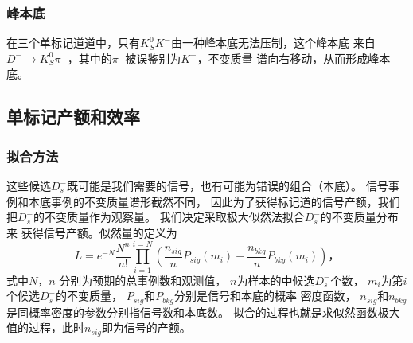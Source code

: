 \subsubsection{峰本底}
在三个单标记道道中，只有$K_{S}^{0}K^{-}$由一种峰本底无法压制，这个峰本底
来自$D^{-}\to K_{S}^{0} \pi^{-}$，其中的$\pi^{-}$被误鉴别为$K^{-}$，不变质量
谱向右移动，从而形成峰本底。

\subsection{单标记产额和效率}

\subsubsection{拟合方法}
这些候选$D_{s}^{-}$既可能是我们需要的信号，也有可能为错误的组合（本底）。
信号事例和本底事例的不变质量谱形截然不同，
因此为了获得标记道的信号产额，我们把$D_{s}^{-}$的不变质量作为观察量。
我们决定采取极大似然法拟合$D_{s}^{-}$的不变质量分布来
获得信号产额。似然量的定义为
\begin{equation}
    L = e^{-N} \frac{N^{n}}{n!} 
    \prod_{i=1}^{i=N} \left( 
    \frac{n_{sig}}{n}  P_{sig}(m_{i}) 
    +  \frac{n_{bkg}}{n} P_{bkg}(m_{i})
\right)，
\end{equation}
式中$N$，$n$ 分别为预期的总事例数和观测值， 
$n$为样本的中候选$D_{s}^{-}$个数，
$m_{i}$为第$i$个候选$D_{s}^{-}$的不变质量，
$P_{sig}$和$P_{bkg}$分别是信号和本底的概率
密度函数，
$n_{sig}$和$n_{bkg}$是同概率密度的参数分别指信号数和本底数。
拟合的过程也就是求似然函数极大值的过程，此时$n_{sig}$即为信号的产额。

